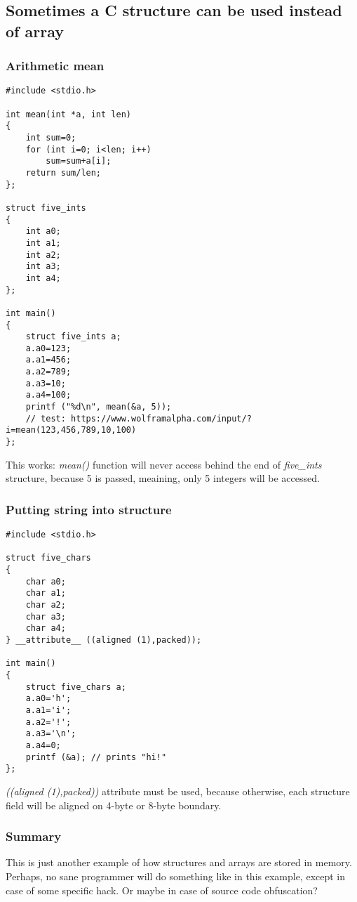 \subsection{Sometimes a C structure can be used instead of array}

\subsubsection{Arithmetic mean}

\begin{lstlisting}[style=customc]
#include <stdio.h>

int mean(int *a, int len)
{
	int sum=0;
	for (int i=0; i<len; i++)
		sum=sum+a[i];
	return sum/len;
};

struct five_ints
{
	int a0;
	int a1;
	int a2;
	int a3;
	int a4;
};

int main()
{
	struct five_ints a;
	a.a0=123;
	a.a1=456;
	a.a2=789;
	a.a3=10;
	a.a4=100;
	printf ("%d\n", mean(&a, 5));
	// test: https://www.wolframalpha.com/input/?i=mean(123,456,789,10,100)
};
\end{lstlisting}

This works: \emph{mean()} function will never access behind the end of \emph{five\_ints} structure,
because 5 is passed, meaining, only 5 integers will be accessed.

\subsubsection{Putting string into structure}

\begin{lstlisting}[style=customc]
#include <stdio.h>

struct five_chars
{
	char a0;
	char a1;
	char a2;
	char a3;
	char a4;
} __attribute__ ((aligned (1),packed));

int main()
{
	struct five_chars a;
	a.a0='h';
	a.a1='i';
	a.a2='!';
	a.a3='\n';
	a.a4=0;
	printf (&a); // prints "hi!"
};
\end{lstlisting}

\emph{((aligned (1),packed))} attribute must be used, because otherwise,
each structure field will be aligned on 4-byte or 8-byte boundary.

\subsubsection{Summary}

This is just another example of how structures and arrays are stored in memory.
Perhaps, no sane programmer will do something like in this example, except in case of some specific hack.
Or maybe in case of source code obfuscation?

